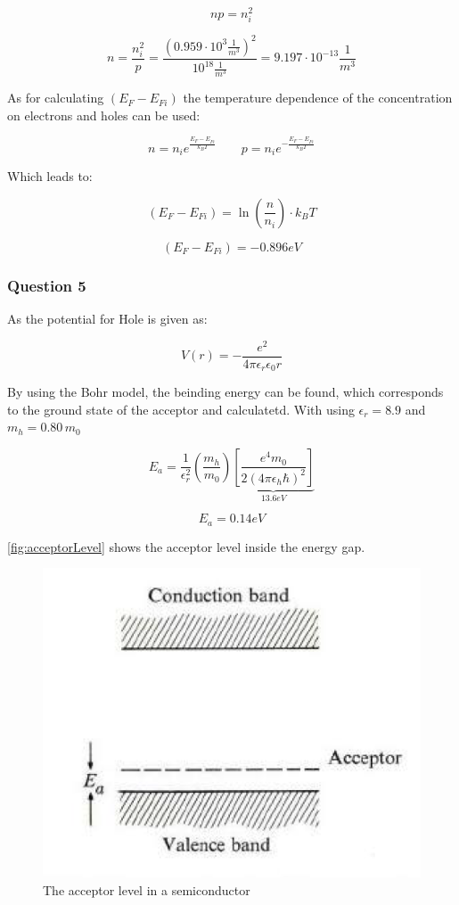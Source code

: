 $$np = n_i^2$$

$$n = \frac{n_i^2}{p} = \frac{(0.959 \cdot 10^3 \frac{1}{m^3})^2}{10^{18} \frac{1}{m^3}} = 9.197 \cdot 10^{-13} \frac{1}{m^3}$$

As for calculating $(E_F-E_{Fi})$ the temperature dependence of the
concentration on electrons and holes can be used:

$$n = n_i e^{\frac{E_F-E_{Fi}}{k_BT}}  \qquad p = n_i e^{-\frac{E_F-E_{Fi}}{k_BT}}$$

Which leads to:

$$(E_F-E_{Fi}) = \ln\left( \frac{n}{n_i} \right) \cdot k_BT$$

$$(E_F-E_{Fi}) = -0.896 eV $$

\subsubsection*{Question 5}

As the potential for Hole is given as:

\begin{equation}
  V(r) = -\frac{e^2}{4\pi \epsilon_r \epsilon_0 r}
\end{equation}

By using the Bohr model, the beinding energy can be found, which
corresponds to the ground state of the acceptor and calculatetd.
With using $\epsilon_r = 8.9$ and $m_h = 0.80\,m_0$


$$
E_a = \frac{1}{\epsilon_r^2} \left(\frac{m_h}{m_0}\right) \underbrace{\left[\frac{e^4m_0}{2(4\pi\epsilon_h\hbar)^2}\right]}_{13.6eV}
$$

$$E_a =  0.14eV$$

\autoref{fig:acceptorLevel} shows the acceptor level inside the energy gap.

\begin{figure}[H]
  \centering
  \includegraphics[width=0.35\linewidth]{Graphics/Chapter3/acceptorLevel.png}
  \caption{The acceptor level in a semiconductor \cite[Elementary Solid State Physics p. 268]{elementary_SSP} }
  \label{fig:acceptorLevel}
\end{figure}

